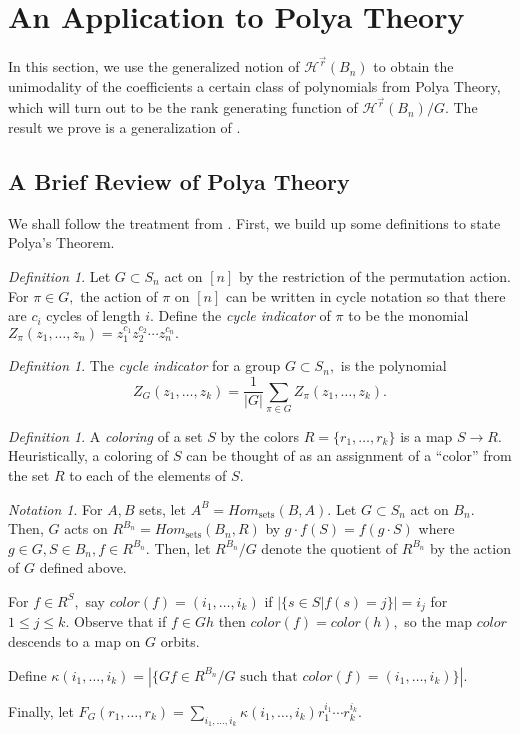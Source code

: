 \documentclass{amsart}
\theoremstyle{remark}
\newtheorem{defn}[thm]{Definition}
\newtheorem{note}[thm]{Notation}
\newcommand\ssec{\subsection}
\renewcommand{\vec}[1]{\overrightarrow{#1}}
\begin{document}
\section{An Application to Polya Theory}
\label{sec:polya}
In this section, we use the generalized notion of $\mathcal H^{\vec r}(B_n)$ to obtain the unimodality of the coefficients a certain class of polynomials from Polya Theory, which will turn out to be the rank generating function of $\mathcal H^{\vec r}(B_n)/G.$ The result we prove is a generalization of \cite[Corollary 7.16]{algebraic_stanley}. 

\ssec{A Brief Review of Polya Theory}

We shall follow the treatment from \cite[Chapter 7]{algebraic_stanley}. First, we build up some definitions to state Polya's Theorem.

\begin{defn}
Let $G \subset S_n$ act on $[n]$ by the restriction of the permutation action. For $\pi \in G,$ the action of $\pi$ on $[n]$ can be written in cycle notation so that there are $c_i$ cycles of length $i.$ Define the {\it cycle indicator} of $\pi$ to be the monomial $Z_\pi(z_1,\ldots, z_n) = z_1^{c_1}z_2^{c_2}\cdots z_n^{c_n}.$
\end{defn}

\begin{defn}
The {\it cycle indicator} for a group $G \subset S_n,$ is the polynomial $$Z_G(z_1,\ldots, z_k) = \frac{1}{|G|}\sum_{\pi \in G} Z_\pi(z_1,\ldots, z_k).$$
\end{defn}

\begin{defn}
A {\it coloring} of a set $S$ by the colors $R = \{r_1,\ldots, r_k\}$ is a map $S \rightarrow R.$ Heuristically, a coloring of $S$ can be thought of as an assignment of a ``color'' from the set $R$ to each of the elements of $S.$
\end{defn}

\begin{note}
For $A,B$ sets, let $A^B = Hom_{\text{sets}}(B,A).$ Let $G \subset S_n$ act on $B_n.$ Then, $G$ acts on $R^{B_n} = Hom_{\text{sets}}(B_n,R)$ by $g \cdot f(S) = f(g\cdot S)$ where $g \in G,S \in B_n, f \in R^{B_n}.$ Then, let $R^{B_n}/G$ denote the quotient of $R^{B_n}$ by the action of $G$ defined above.

For $f \in R^{S},$ say $color(f) = (i_1,\ldots, i_k)$ if $|\{s \in S|f(s) = j\}| = i_j$ for $1 \leq j \leq k.$ Observe that if $f \in Gh$ then $color(f) = color(h),$ so the map $color$ descends to a map on $G$ orbits.

Define $\kappa(i_1,\ldots, i_k) = |\{Gf \in R^{B_n}/G \text{ such that } color(f) = (i_1,\ldots, i_k) \}|.$

Finally, let $F_G(r_1,\ldots, r_k) = \sum_{i_1,\ldots, i_k} \kappa(i_1,\ldots, i_k)r_1^{i_1} \cdots r_k^{i_k}.$
\end{note}
\end{document}
